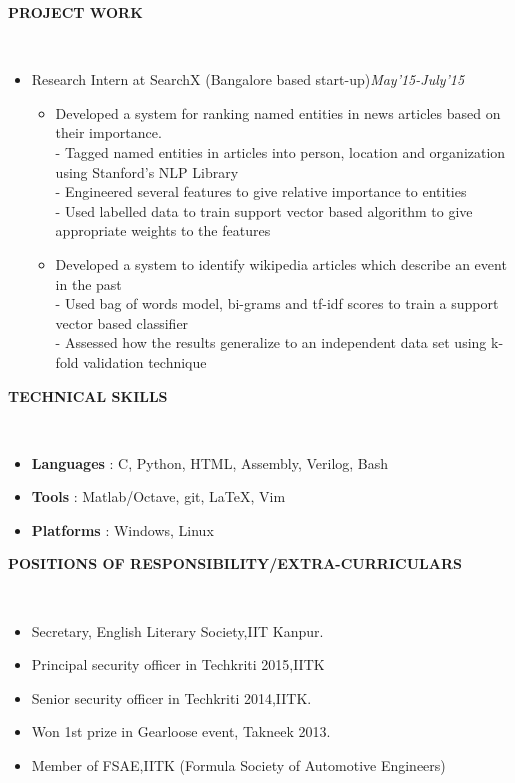 \documentclass[a4paper,10pt]{article}
\newcommand{\isep}{-2 pt}
\newcommand{\lsep}{-0.5cm}
\newcommand{\resheading}[1]{{\small \colorbox{mygrey}{\begin{minipage}{0.975\textwidth}{\textbf{#1 \vphantom{p\^{E}}}}\end{minipage}}}}
\begin{document}
\resheading{\textbf{PROJECT WORK} }\\[\lsep]
\begin{itemize}
\item\noindent Research Intern at SearchX (Bangalore based start-up)\hfill\emph{May'15-July'15}
\vspace{-2mm}
\begin{itemize}\itemsep \isep
\item \noindent Developed a system for ranking named entities in news articles based on their importance.\\
- Tagged named entities in articles into person, location and organization using Stanford's NLP Library\\
- Engineered several features to give relative importance to entities\\
- Used labelled data to train support vector based algorithm to give appropriate weights to the features\\\vspace{-4mm}
\item \noindent Developed a system to identify wikipedia articles which describe an event in the past\\
- Used bag of words model, bi-grams and tf-idf scores to train a support vector based classifier\\
- Assessed how the results generalize to an independent data set using k-fold validation technique
\end{itemize}
\end{itemize}

\resheading{\textbf{TECHNICAL SKILLS} }\\[\lsep]
\begin{itemize}\itemsep\isep
\item \noindent \textbf{Languages} : C, Python, HTML, Assembly, Verilog, Bash
\item \noindent \textbf{Tools} : Matlab/Octave, git, \LaTeX, Vim
\item \noindent \textbf{Platforms} : Windows, Linux
\end{itemize}

\resheading{\textbf{POSITIONS OF RESPONSIBILITY/EXTRA-CURRICULARS} }\\[\lsep]
\begin{itemize}\itemsep \isep
\item \noindent Secretary, English Literary Society,IIT Kanpur.
\item \noindent Principal security officer in Techkriti 2015,IITK
\item \noindent Senior security officer in Techkriti 2014,IITK.
\item \noindent Won 1st prize in Gearloose event, Takneek 2013.
\item \noindent Member of FSAE,IITK (Formula Society of Automotive Engineers)
\end{itemize}
\end{document}
